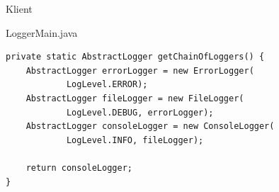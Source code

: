 \begin{frame}[fragile]{Klient}
	\begin{exampleblock}{LoggerMain.java}
 		\begin{lstlisting}
private static AbstractLogger getChainOfLoggers() {
    AbstractLogger errorLogger = new ErrorLogger(
            LogLevel.ERROR);
    AbstractLogger fileLogger = new FileLogger(
            LogLevel.DEBUG, errorLogger);
    AbstractLogger consoleLogger = new ConsoleLogger(
            LogLevel.INFO, fileLogger);
    
    return consoleLogger;
}
 		\end{lstlisting}
 	\end{exampleblock}
\end{frame}